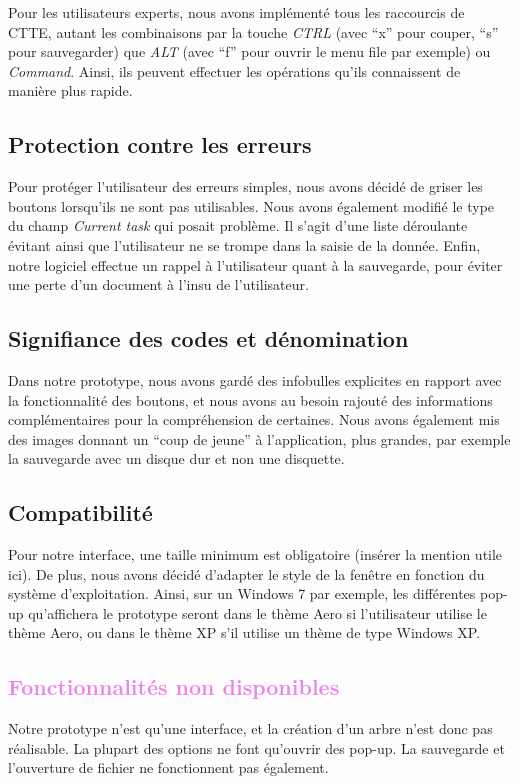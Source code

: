 \documentclass[12pt, a4paper]{article}
\begin{document}
Pour les utilisateurs experts, nous avons implémenté tous les raccourcis de CTTE, autant les combinaisons par la touche \emph{CTRL} (avec ``x'' pour couper, ``s'' pour sauvegarder) que \emph{ALT} (avec ``f'' pour ouvrir le menu file par exemple) ou \emph{Command}. Ainsi, ils peuvent effectuer les opérations qu'ils connaissent de manière plus rapide. 
\textcolor{NavyBlue}{\subsection{Protection contre les erreurs}}

Pour protéger l'utilisateur des erreurs simples, nous avons décidé de griser les boutons lorsqu'ils ne sont pas utilisables. Nous avons également modifié le type du champ \emph{Current task} qui posait problème. Il s'agit d'une liste déroulante évitant ainsi que l'utilisateur ne se trompe dans la saisie de la donnée. Enfin, notre logiciel effectue un rappel à l'utilisateur quant à la sauvegarde, pour éviter une perte d'un document à l'insu de l'utilisateur.

\textcolor{NavyBlue}{\subsection{Signifiance des codes et dénomination}}

Dans notre prototype, nous avons gardé des infobulles explicites en rapport avec la fonctionnalité des boutons, et nous avons au besoin rajouté des informations complémentaires pour la compréhension de certaines. Nous avons également mis des images donnant un ``coup de jeune'' à l'application, plus grandes, par exemple la sauvegarde avec un disque dur et non une disquette.

\textcolor{NavyBlue}{\subsection{Compatibilité}}

Pour notre interface, une taille minimum est obligatoire (insérer la mention utile ici). De plus, nous avons décidé d'adapter le style de la fenêtre en fonction du système d'exploitation. Ainsi, sur un Windows 7 par exemple, les différentes pop-up qu'affichera le prototype seront dans le thème Aero si l'utilisateur utilise le thème Aero, ou dans le thème XP s’il utilise un thème de type Windows XP.

\textcolor{Violet}{\section{Fonctionnalités non disponibles}}

Notre prototype n'est qu'une interface, et la création d'un arbre n'est donc pas réalisable. La plupart des options ne font qu'ouvrir des pop-up. La sauvegarde et l'ouverture de fichier ne fonctionnent pas également.
\end{document}
